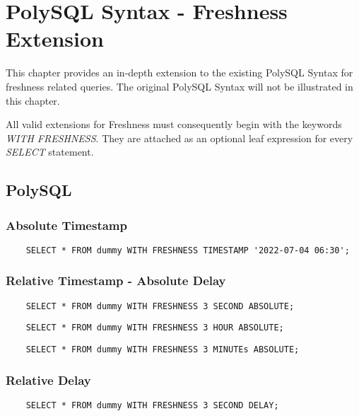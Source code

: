 \chapter{PolySQL Syntax - Freshness Extension}
This chapter provides an in-depth extension to the existing PolySQL Syntax for freshness related queries.
The original PolySQL Syntax will not be illustrated in this chapter.

All valid extensions for Freshness must consequently begin with the keywords \emph{WITH FRESHNESS}.
They are attached as an optional leaf expression for every \emph{SELECT} statement.

\tocless\section{PolySQL}

\tocless\subsection{Absolute Timestamp}

\begin{verbatim}
    SELECT * FROM dummy WITH FRESHNESS TIMESTAMP '2022-07-04 06:30';
\end{verbatim}


\tocless\subsection{Relative Timestamp - Absolute Delay}

\begin{verbatim}
    SELECT * FROM dummy WITH FRESHNESS 3 SECOND ABSOLUTE;
\end{verbatim}

\begin{verbatim}
    SELECT * FROM dummy WITH FRESHNESS 3 HOUR ABSOLUTE;
\end{verbatim}

\begin{verbatim}
    SELECT * FROM dummy WITH FRESHNESS 3 MINUTEs ABSOLUTE;
\end{verbatim}

\tocless\subsection{Relative Delay}

\begin{verbatim}
    SELECT * FROM dummy WITH FRESHNESS 3 SECOND DELAY;
\end{verbatim}

